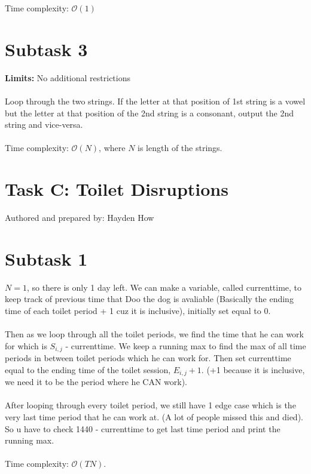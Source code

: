 \documentclass{report}
\begin{document}
Time complexity: $\mathcal{O}(1)$

\section*{Subtask 3}
\textbf{Limits: } No additional restrictions\\\\
Loop through the two strings. If the letter at that position of 1st string is a vowel but the letter at that position of the 2nd string is a consonant, output the 2nd string and vice-versa. \\\\

Time complexity: $\mathcal{O}(N)$, where $N$ is length of the strings.

\pagebreak
\hfill \break \hfill \break

\section*{Task C: Toilet Disruptions}
Authored and prepared by: Hayden How

\section*{Subtask 1} 
$N = 1$, so there is only 1 day left. We can make a variable, called current\textunderscore time, to keep track of previous time that Doo the dog is avaliable (Basically the ending time of each toilet period + 1 cuz it is inclusive), initially set equal to 0. 
\\\\
Then as we loop through all the toilet periods, we find the time that he can work for which is $S_{i,j}$ - current\textunderscore time. We keep a running max to find the max of all time periods in between toilet periods which he can work for. Then set current\textunderscore time equal to the ending time of the toilet session, $E_{i,j} + 1$. (+1 because it is inclusive, we need it to be the period where he CAN work).
\\\\
After looping through every toilet period, we still have 1 edge case which is the very last time period that he can work at. (A lot of people missed this and died). So u have to check 1440 - current\textunderscore time to get last time period and print the running max.
\\\\
Time complexity: $\mathcal{O}(TN)$.
\end{document}
